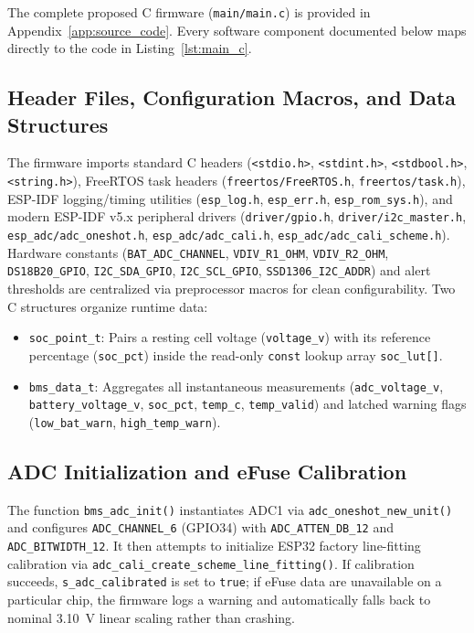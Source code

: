 \documentclass[12pt,a4paper]{article}
\begin{document}
The complete proposed C firmware (\texttt{main/main.c}) is provided in Appendix~\ref{app:source_code}. Every software component documented below maps directly to the code in Listing~\ref{lst:main_c}.

\subsection{Header Files, Configuration Macros, and Data Structures}
The firmware imports standard C headers (\texttt{<stdio.h>}, \texttt{<stdint.h>}, \texttt{<stdbool.h>}, \texttt{<string.h>}), FreeRTOS task headers (\texttt{freertos/FreeRTOS.h}, \texttt{freertos/task.h}), ESP-IDF logging/timing utilities (\texttt{esp\_log.h}, \texttt{esp\_err.h}, \texttt{esp\_rom\_sys.h}), and modern ESP-IDF v5.x peripheral drivers (\texttt{driver/gpio.h}, \texttt{driver/i2c\_master.h}, \texttt{esp\_adc/adc\_oneshot.h}, \texttt{esp\_adc/adc\_cali.h}, \texttt{esp\_adc/adc\_cali\_scheme.h}). Hardware constants (\texttt{BAT\_ADC\_CHANNEL}, \texttt{VDIV\_R1\_OHM}, \texttt{VDIV\_R2\_OHM}, \texttt{DS18B20\_GPIO}, \texttt{I2C\_SDA\_GPIO}, \texttt{I2C\_SCL\_GPIO}, \texttt{SSD1306\_I2C\_ADDR}) and alert thresholds are centralized via preprocessor macros for clean configurability. Two C structures organize runtime data:
\begin{itemize}
    \item \texttt{soc\_point\_t}: Pairs a resting cell voltage (\texttt{voltage\_v}) with its reference percentage (\texttt{soc\_pct}) inside the read-only \texttt{const} lookup array \texttt{soc\_lut[]}.
    \item \texttt{bms\_data\_t}: Aggregates all instantaneous measurements (\texttt{adc\_voltage\_v}, \texttt{battery\_voltage\_v}, \texttt{soc\_pct}, \texttt{temp\_c}, \texttt{temp\_valid}) and latched warning flags (\texttt{low\_bat\_warn}, \texttt{high\_temp\_warn}).
\end{itemize}

\subsection{ADC Initialization and eFuse Calibration}
The function \texttt{bms\_adc\_init()} instantiates ADC1 via \texttt{adc\_oneshot\_new\_unit()} and configures \texttt{ADC\_CHANNEL\_6} (GPIO34) with \texttt{ADC\_ATTEN\_DB\_12} and \texttt{ADC\_BITWIDTH\_12}. It then attempts to initialize ESP32 factory line-fitting calibration via \texttt{adc\_cali\_create\_scheme\_line\_fitting()}. If calibration succeeds, \texttt{s\_adc\_calibrated} is set to \texttt{true}; if eFuse data are unavailable on a particular chip, the firmware logs a warning and automatically falls back to nominal 3.10~V linear scaling rather than crashing.
\end{document}
